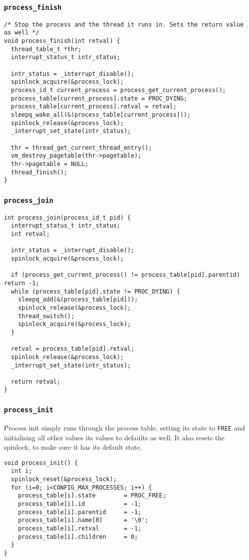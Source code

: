 \documentclass[a4paper,12pt]{article}
\begin{document}
\subsubsection{\texttt{process\_finish}}


\begin{lstlisting}
/* Stop the process and the thread it runs in. Sets the return value as well */
void process_finish(int retval) {
  thread_table_t *thr;
  interrupt_status_t intr_status;
  
  intr_status = _interrupt_disable();
  spinlock_acquire(&process_lock);
  process_id_t current_process = process_get_current_process();
  process_table[current_process].state = PROC_DYING;
  process_table[current_process].retval = retval;
  sleepq_wake_all(&(process_table[current_process]));
  spinlock_release(&process_lock);
  _interrupt_set_state(intr_status);

  thr = thread_get_current_thread_entry();
  vm_destroy_pagetable(thr->pagetable);
  thr->pagetable = NULL;
  thread_finish();
}
\end{lstlisting}

\subsubsection{\texttt{process\_join}}


\begin{lstlisting}
int process_join(process_id_t pid) {
  interrupt_status_t intr_status;
  int retval;

  intr_status = _interrupt_disable();
  spinlock_acquire(&process_lock);

  if (process_get_current_process() != process_table[pid].parentid) return -1;
  while (process_table[pid].state != PROC_DYING) {
    sleepq_add(&(process_table[pid]));
    spinlock_release(&process_lock);
    thread_switch();
    spinlock_acquire(&process_lock);
  }

  retval = process_table[pid].retval;
  spinlock_release(&process_lock);
  _interrupt_set_state(intr_status);

  return retval;
} 
\end{lstlisting}

\subsubsection{\texttt{process\_init}}
Process init simply runs through the process table, setting its state to \texttt{FREE} and initialising all other values its values to defaults as well. It also resets the spinlock, to make sure it has its default state.
\begin{lstlisting}
void process_init() {
  int i;
  spinlock_reset(&process_lock);
  for (i=0; i<CONFIG_MAX_PROCESSES; i++) {
    process_table[i].state        = PROC_FREE;
    process_table[i].id           = -1;
    process_table[i].parentid     = -1;
    process_table[i].name[0]      = '\0'; 
    process_table[i].retval       = -1;
    process_table[i].children     = 0;
  }
}
\end{lstlisting}
\end{document}
